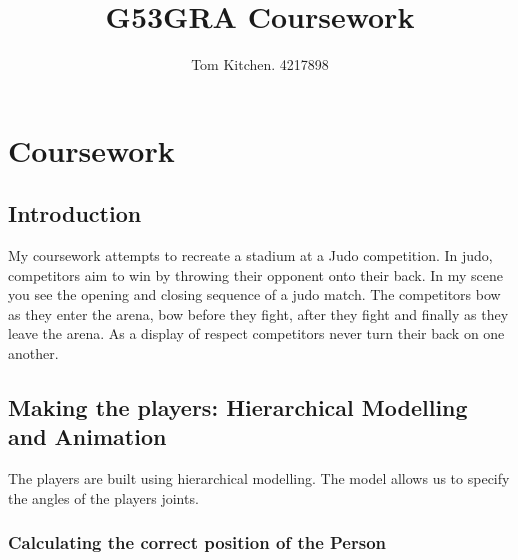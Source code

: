 \documentclass[12pt]{article}
\begin{document}

\title{G53GRA Coursework}
\author{Tom Kitchen. 4217898}

\maketitle


\section{Coursework}
\subsection*{Introduction}

My coursework attempts to recreate a stadium at a Judo competition. In judo, competitors aim to win by throwing their opponent onto their back. In my scene you see the opening and closing sequence of a judo match. The competitors bow as they enter the arena, bow before they fight, after they fight and finally as they leave the arena. As a display of respect competitors never turn their back on one another.

\subsection{Making the players: Hierarchical Modelling and Animation }
The players are built using hierarchical modelling. The model allows us to specify the angles of the players joints. 

\subsubsection{Calculating the correct position of the Person}
\end{document}
